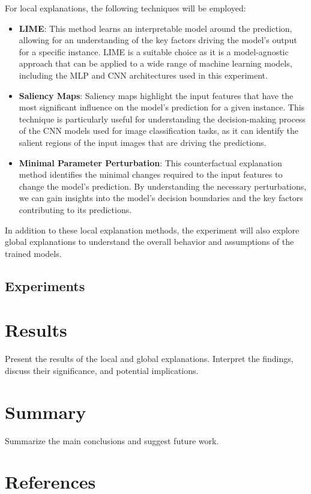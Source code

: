 \documentclass[conference]{IEEEtran}
\begin{document}
    For local explanations, the following techniques will be employed:

    \begin{itemize}
    \item \textbf{LIME}: This method learns an interpretable model around the prediction, allowing for an understanding of the key factors driving the model's output for a specific instance. LIME is a suitable choice as it is a model-agnostic approach that can be applied to a wide range of machine learning models, including the MLP and CNN architectures used in this experiment.
    \item \textbf{Saliency Maps}: Saliency maps highlight the input features that have the most significant influence on the model's prediction for a given instance. This technique is particularly useful for understanding the decision-making process of the CNN models used for image classification tasks, as it can identify the salient regions of the input images that are driving the predictions.
    \item \textbf{Minimal Parameter Perturbation}: This counterfactual explanation method identifies the minimal changes required to the input features to change the model's prediction. By understanding the necessary perturbations, we can gain insights into the model's decision boundaries and the key factors contributing to its predictions.
    \end{itemize}

    In addition to these local explanation methods, the experiment will also explore global explanations to understand the overall behavior and assumptions of the trained models.

\subsection{Experiments}\label{subsec:experiments}

\section{Results}\label{sec:results}
    Present the results of the local and global explanations.
    Interpret the findings, discuss their significance, and potential implications.

\section{Summary}\label{sec:summary}
    Summarize the main conclusions and suggest future work.

\section{References}\label{sec:references}

    
    
\end{document}
